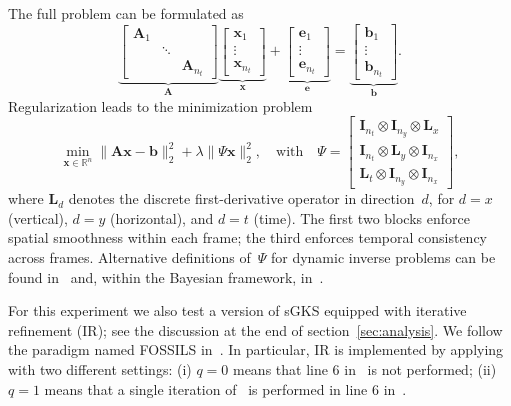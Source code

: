 \documentclass[%
  a4paper,
  onecolumn,
  colorlinks,
]{preprint}
\theoremstyle{plain}
\theoremstyle{definition}
\newcommand{\R}{\ensuremath{\mathbb{R}}}
\newcommand{\bA}{\ensuremath{\boldsymbol{A}}}
\newcommand{\bI}{\ensuremath{\boldsymbol{I}}}
\newcommand{\bL}{\ensuremath{\boldsymbol{L}}}
\newcommand{\bb}{\mathbf{b}}
\newcommand{\bx}{\mathbf{x}}
\newcommand{\be}{\mathbf{e}}
\begin{document}
The full problem can be formulated as
\begin{equation}\label{eq:blockF}
\underbrace{
\begin{bmatrix} \bA_{1} \\
 & \ddots \\
 & & \bA_{n_t}
\end{bmatrix}}_{\bA}
\underbrace{\begin{bmatrix}
    \bx_1 \\ \vdots \\ \bx_{n_t}
\end{bmatrix}}_{\bx}
+
\underbrace{\begin{bmatrix}
    \be_1 \\ \vdots \\ \be_{n_t}
\end{bmatrix}}_{\be}
=
\underbrace{\begin{bmatrix}
    \bb_1 \\ \vdots \\ \bb_{n_t}
\end{bmatrix}}_{\bb}.
\end{equation}
Regularization leads to the minimization problem
\begin{equation}\label{eq:spacetime_tik}
    \min_{\bx \in \R^{n}} \|\bA\bx - \bb\|_2^2 + \lambda\|\Psi\bx\|_2^2,
\quad \text{with} \quad \Psi = \begin{bmatrix}
  \bI_{n_t}\otimes\bI_{n_y}\otimes\bL_{x} \\
  \bI_{n_t}\otimes \bL_{y}\otimes\bI_{n_x} \\
  \bL_{t}\otimes\bI_{n_y}\otimes\bI_{n_x}
\end{bmatrix},
\end{equation}
where $\bL_d$ denotes the discrete first-derivative operator in
direction~$d$, for $d = x$ (vertical), $d = y$ (horizontal), and
$d = t$ (time).
The first two blocks enforce spatial smoothness within each frame;
the third enforces temporal consistency across frames.
Alternative definitions of~$\Psi$ for dynamic inverse problems can be
found in~\cite{pasha2021efficient} and, within the Bayesian framework,
in~\cite{lan2025spatiotemporal}.

For this experiment we also test a version of sGKS equipped with iterative refinement (IR); see the discussion at the end of section~\ref{sec:analysis}. We follow the paradigm named FOSSILS in~\cite{Iterative_refinement_sketching}. In particular, IR is implemented by applying~\cite[Algorithm 1]{Iterative_refinement_sketching} with two different settings: (i) $q=0$ means that line 6 in~\cite[Algorithm 1]{Iterative_refinement_sketching} is not performed; (ii) $q=1$ means that a single iteration of~\cite[Algorithm 2]{Iterative_refinement_sketching} is performed in line 6 in~\cite[Algorithm 1]{Iterative_refinement_sketching}. 
\end{document}
